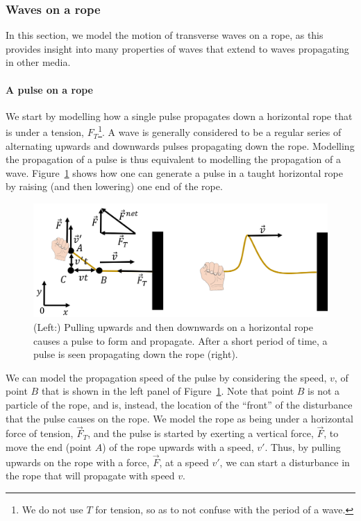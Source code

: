 \subsubsection{Waves on a rope}

In this section, we model the motion of transverse waves on a rope, as this provides insight into many properties of waves that extend to waves propagating in other media.

\paragraph{A pulse on a rope}

We start by modelling how a single pulse propagates down a horizontal rope that is under a tension, $F_T$\footnote{We do not use $T$ for tension, so as to not confuse with the period of a wave.}. A wave is generally considered to be a regular series of alternating upwards and downwards pulses propagating down the rope. Modelling the propagation of a pulse is thus equivalent to modelling the propagation of a wave. Figure~\ref{fig:waves:pulse} shows how one can generate a pulse in a taught horizontal rope by raising (and then lowering) one end of the rope.

\begin{figure}[!htbp]
\centering
\includegraphics[width=0.8\linewidth]{files/pulse-5b40f374a8842266c668cb8b3a29c68d.png}
\caption[]{(Left:) Pulling upwards and then downwards on a horizontal rope causes a pulse to form and propagate. After a short period of time, a pulse is seen propagating down the rope (right).}
\label{fig:waves:pulse}
\end{figure}

We can model the propagation speed of the pulse by considering the speed, $v$, of point $B$ that is shown in the left panel of Figure~\ref{fig:waves:pulse}. Note that point $B$ is not a particle of the rope, and is, instead, the location of the ``front'' of the disturbance that the pulse causes on the rope. We model the rope as being under a horizontal force of tension, $\vec F_T$, and the pulse is started by exerting a vertical force, $\vec F$, to move the end (point $A$) of the rope upwards with a speed, $v'$. Thus, by pulling upwards on the rope with a force, $\vec F$, at a speed $v'$, we can start a disturbance in the rope that will propagate with speed $v$.

